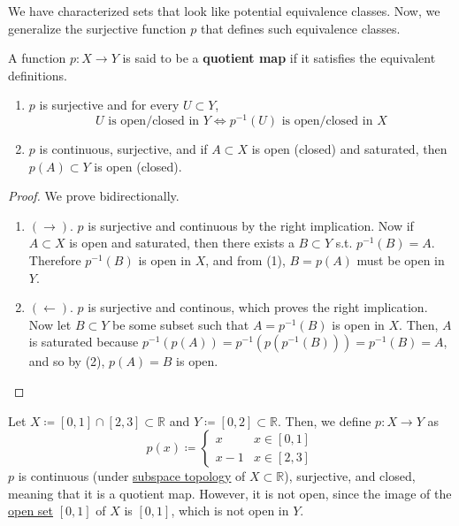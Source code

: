 	We have characterized sets that look like potential equivalence classes. Now, we generalize the surjective function $p$ that defines such equivalence classes. 

  \begin{definition}
    \label{def:quotient-map}
    A function $p: X \rightarrow Y$ is said to be a \textbf{quotient map} if it satisfies the equivalent definitions. 
		\begin{enumerate}
		  \item $p$ is surjective and for every $U \subset Y$, 
				\begin{equation}
					U \text{ is open/closed in } Y \iff p^{-1}(U) \text{ is open/closed in } X
				\end{equation} 

			\item $p$ is continuous, surjective, and if $A \subset X$ is open (closed) and saturated, then $p(A) \subset Y$ is open (closed). 
		\end{enumerate}
  \end{definition}
	\begin{proof}
	  We prove bidirectionally. 
		\begin{enumerate}
			\item $(\rightarrow)$. $p$ is surjective and continuous by the right implication. Now if $A \subset X$ is open and saturated, then there exists a $B \subset Y$ s.t. $p^{-1}(B) = A$. Therefore $p^{-1}(B)$ is open in $X$, and from (1), $B = p(A)$ must be open in $Y$. 
			\item $(\leftarrow)$. $p$ is surjective and continous, which proves the right implication. Now let $B \subset Y$ be some subset such that $A = p^{-1} (B)$ is open in $X$. Then, $A$ is saturated because $p^{-1}(p(A)) = p^{-1}(p(p^{-1}(B))) = p^{-1}(B) = A$, and so by (2), $p(A) = B$ is open. 
		\end{enumerate}
	\end{proof}

	\begin{example}
	  \label{ex:quotient-map-that-sticks-two-intervals-together}
    Let $X \coloneqq [0,1] \cap [2,3] \subset \mathbb{R}$ and $Y \coloneqq [0,2] \subset \mathbb{R}$. Then, we define $p: X \rightarrow Y$ as 
    \begin{equation}
      p(x) \coloneqq \begin{cases} x & x \in [0,1] \\ x-1 & x \in [2,3] \end{cases}
    \end{equation}
    $p$ is continuous (under \hyperref[def:subspace-topology]{subspace topology} of $X \subset \mathbb{R}$), surjective, and closed, meaning that it is a quotient map. However, it is not open, since the image of the \hyperref[def:open-set]{open set} $[0,1]$ of $X$ is $[0,1]$, which is not open in $Y$. 
  \end{example}

